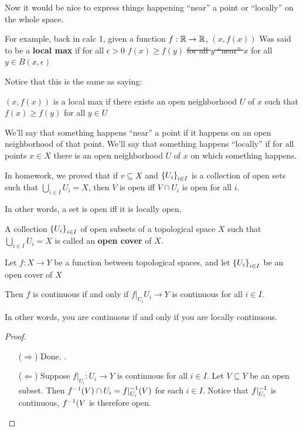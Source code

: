 \documentclass[12pt, twosided]{article}
\begin{document}
  Now it would be nice to express things happening ``near'' a point or ``locally'' on the whole space.

  \begin{exa}
    For example, back in calc 1, given a function \(f: \mathbb{R} \to \mathbb{R}\), \((x, f(x))\) Was said to be a \textbf{local max} if {\color{red}for all \(\epsilon > 0\)} \(f(x) \geq f(y)\) \sout{for all \(y\) ``near'' \(x\)} {\color{red} for all \(y \in B(x, \epsilon)\)}

    Notice that this is the same as saying:

    \((x, f(x))\) is a local max if there exists an open neighborhood \(U\) of \(x\) such that \(f(x) \geq f(y)\) for all \(y \in U\)
  \end{exa}


  We'll say that something happens ``near'' a point if it happens on an open neighborhood of that point. We'll say that something happens ``locally'' if for all points \(x \in X\) there is an open neighborhood \(U \) of \(x\)  on which something happens.

  In homework, we proved that if \(v \subseteq X\) and \(\left\{ U_i \right\}_{i \in I}\) is a collection of open sets such that \(\bigcup_{i \in I} U_i = X\), then \(V\) is open iff \(V \cap U_i\) is open for all \(i\).

  In other words, a set is open iff it is locally open.

  \begin{df}
    A collection \(\left\{ U_i\right\}_{i \in I}\) of open subsets of a topological space \(X\) such that \(\bigcup_{i \in I} U_i = X\) is called an \textbf{open cover} of \(X\). 
  \end{df}

  \begin{thm}
    Let \(f: X \to Y\) be a function between topological spaces, and let \(\left\{ U_i \right\}_{i \in I}\) be an open cover of \(X\)

    Then \(f\) is continuous if and only if \(f\vert_{U_i} U_i \to Y\) is continuous for all \(i \in I\).
  \end{thm}

  In other words, you are continuous if and only if you are locally continuous.

  \begin{proof}
    \begin{enumerate}
    \item [(\(\Rightarrow\))] Done. \partdone.
    \item [(\(\Leftarrow\))] Suppose \(f\vert_{U_i}: U_i \to Y\) is continuous for all \(i \in I\). Let \(V \subseteq Y\) be an open subset. Then \(f^{-1}(V) \cap U_i = f\vert_{U_i}^{-1}(V)\) for each \(i \in I\). Notice that \(f\vert_{U_i}^{-1}\) is continuous, \(f^{-1}(V\) is therefore open.
    \end{enumerate}
  \end{proof}
\end{document}
